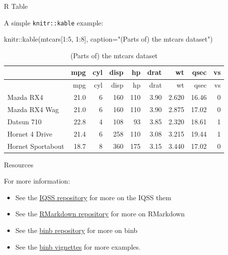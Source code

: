 \documentclass[12pt,ignorenonframetext,compress]{beamer}
\newenvironment{Shaded}{}{}
\newcommand{\DataTypeTok}[1]{#1}
\newcommand{\DecValTok}[1]{#1}
\newcommand{\KeywordTok}[1]{\textcolor[rgb]{0.00,0.00,1.00}{#1}}
\newcommand{\NormalTok}[1]{#1}
\newcommand{\OperatorTok}[1]{#1}
\newcommand{\StringTok}[1]{\textcolor[rgb]{0.00,0.50,0.50}{#1}}
\providecommand{\tightlist}{%
  \setlength{\itemsep}{0pt}\setlength{\parskip}{0pt}}
\begin{document}
\begin{frame}[fragile]{R Table}
\protect\hypertarget{r-table}{}

A simple \texttt{knitr::kable} example:

\small

\begin{Shaded}
\begin{Highlighting}[]
\NormalTok{knitr}\OperatorTok{::}\KeywordTok{kable}\NormalTok{(mtcars[}\DecValTok{1}\OperatorTok{:}\DecValTok{5}\NormalTok{, }\DecValTok{1}\OperatorTok{:}\DecValTok{8}\NormalTok{],}
             \DataTypeTok{caption=}\StringTok{"(Parts of) the mtcars dataset"}\NormalTok{)}
\end{Highlighting}
\end{Shaded}

\begin{longtable}[]{@{}lrrrrrrrr@{}}
\caption{(Parts of) the mtcars dataset}\tabularnewline
\toprule
& mpg & cyl & disp & hp & drat & wt & qsec & vs\tabularnewline
\midrule
\endfirsthead
\toprule
& mpg & cyl & disp & hp & drat & wt & qsec & vs\tabularnewline
\midrule
\endhead
Mazda RX4 & 21.0 & 6 & 160 & 110 & 3.90 & 2.620 & 16.46 &
0\tabularnewline
Mazda RX4 Wag & 21.0 & 6 & 160 & 110 & 3.90 & 2.875 & 17.02 &
0\tabularnewline
Datsun 710 & 22.8 & 4 & 108 & 93 & 3.85 & 2.320 & 18.61 &
1\tabularnewline
Hornet 4 Drive & 21.4 & 6 & 258 & 110 & 3.08 & 3.215 & 19.44 &
1\tabularnewline
Hornet Sportabout & 18.7 & 8 & 360 & 175 & 3.15 & 3.440 & 17.02 &
0\tabularnewline
\bottomrule
\end{longtable}

\end{frame}

\begin{frame}{Resources}
\protect\hypertarget{resources}{}

\begin{block}{For more information:}

\begin{itemize}
\tightlist
\item
  See the \href{https://github.com/IQSS/iqss-beamer-theme}{IQSS
  repository} for more on the IQSS them
\item
  See the \href{https://github.com/rstudio/rmarkdown}{RMarkdown
  repository} for more on RMarkdown
\item
  See the \href{https://github.com/eddelbuettel/binb}{binb repository}
  for more on binb
\item
  See the \href{https://github.com/eddelbuettel/binb/vignettes}{binb
  vignettes} for more examples.
\end{itemize}

\end{block}

\end{frame}
\end{document}
